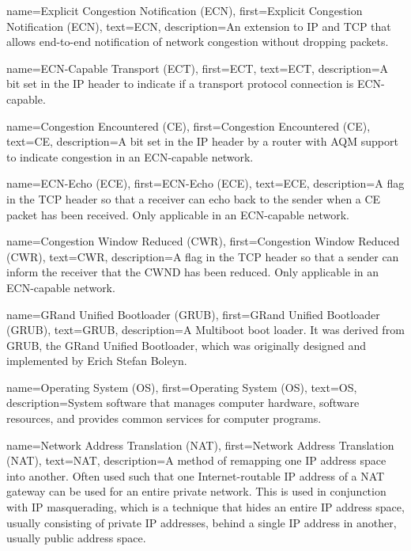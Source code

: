 {
    name={Explicit Congestion Notification (ECN)},
    first={Explicit Congestion Notification (ECN)},
    text={ECN},
    description={An extension to IP and TCP that allows end-to-end notification of network congestion without dropping packets.}
}

{
    name={ECN-Capable Transport (ECT)},
    first={ECT},
    text={ECT},
    description={A bit set in the IP header to indicate if a transport protocol connection is ECN-capable.}
}

{
    name={Congestion Encountered (CE)},
    first={Congestion Encountered (CE)},
    text={CE},
    description={A bit set in the IP header by a router with AQM support to indicate congestion in an ECN-capable network.}
}

{
    name={ECN-Echo (ECE)},
    first={ECN-Echo (ECE)},
    text={ECE},
    description={A flag in the TCP header so that a receiver can echo back to the sender when a CE packet has been received. Only applicable in an ECN-capable network.}
}

{
    name={Congestion Window Reduced (CWR)},
    first={Congestion Window Reduced (CWR)},
    text={CWR},
    description={A flag in the TCP header so that a sender can inform the receiver that the CWND has been reduced. Only applicable in an ECN-capable network.}
}

{
    name={GRand Unified Bootloader (GRUB)},
    first={GRand Unified Bootloader (GRUB)},
    text={GRUB},
    description={A Multiboot boot loader. It was derived from GRUB, the GRand Unified Bootloader, which was originally designed and implemented by Erich Stefan Boleyn.}
}

{
    name={Operating System (OS)},
    first={Operating System (OS)},
    text={OS},
    description={System software that manages computer hardware, software resources, and provides common services for computer programs.}
}

{
    name={Network Address Translation (NAT)},
    first={Network Address Translation (NAT)},
    text={NAT},
    description={A method of remapping one IP address space into another. Often used such that one Internet-routable IP address of a NAT gateway can be used for an entire private network. This is used in conjunction with IP masquerading, which is a technique that hides an entire IP address space, usually consisting of private IP addresses, behind a single IP address in another, usually public address space.}
}

